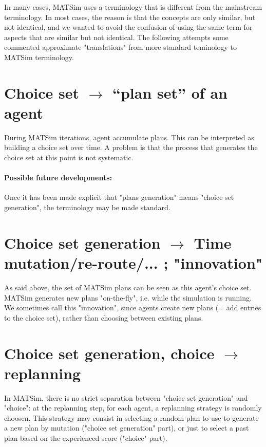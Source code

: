 
\bigskip

In  many cases, MATSim uses a terminology that is different from the  mainstream terminology. In most cases, the reason is that the  concepts are only similar, but not identical, and we wanted to avoid the  confusion of using the same term for aspects that are similar but not  identical. The following attempts some commented approximate  "translations" from more standard teminology to MATSim terminology.

\section{Choice set $\to$ ``plan set'' of an agent}

During MATSim iterations, agent accumulate   plans. This can be  interpreted as building a choice set over  time. A  problem is that the  process that generates the choice  set at this  point is not systematic.

\paragraph{Possible future developments:} Once it has been made explicit that "plans generation" means "choice set generation", the terminology may be made standard.

\section{Choice set generation $\to$ Time mutation/re-route/... ; "innovation"}

As said above, the set of MATSim plans can   be seen as this agent's choice set. MATSim generates new plans   "on-the-fly", i.e. while the simulation is running. We sometimes  call  this "innovation", since agents create new plans (= add entries to  the  choice set), rather than choosing between existing plans.

\section{Choice set generation, choice $\to$ replanning}

In MATSim, there is no strict separation between "choice set  generation" and "choice": at the replanning step, for each agent, a  replanning strategy is randomly choosen. This strategy may consist in  selecting a random plan to use to generate a new plan by mutation  ("choice set generation" part), or just to select a past plan based on  the experienced score ("choice" part).


